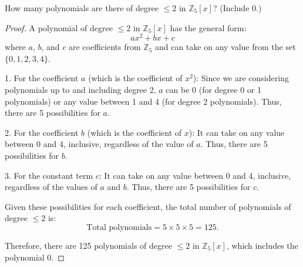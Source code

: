 \documentclass[12pt]{amsart}
\theoremstyle{definition}
\numberwithin{equation}{section}
\theoremstyle{plain}
\newcommand{\Z}{\mathbb{Z}}
\begin{document}
\begin{exercise}{6} How many polynomials are there of degree $\leq 2\text{ in } \Z_5[x]$? (Include 0.)

\begin{proof}
A polynomial of degree \( \leq 2 \) in \( \Z_5[x] \) has the general form:
\[ ax^2 + bx + c \]
where \( a \), \( b \), and \( c \) are coefficients from \( \Z_5 \) and can take on any value from the set \( \{0, 1, 2, 3, 4\} \).

1. For the coefficient \( a \) (which is the coefficient of \( x^2 \)):  
   Since we are considering polynomials up to and including degree 2, \( a \) can be 0 (for degree 0 or 1 polynomials) or any value between 1 and 4 (for degree 2 polynomials). Thus, there are 5 possibilities for \( a \).

2. For the coefficient \( b \) (which is the coefficient of \( x \)):  
   It can take on any value between 0 and 4, inclusive, regardless of the value of \( a \). Thus, there are 5 possibilities for \( b \).

3. For the constant term \( c \):  
   It can take on any value between 0 and 4, inclusive, regardless of the values of \( a \) and \( b \). Thus, there are 5 possibilities for \( c \).

Given these possibilities for each coefficient, the total number of polynomials of degree \( \leq 2 \) is:
\[ \text{Total polynomials} = 5 \times 5 \times 5 = 125. \]

Therefore, there are 125 polynomials of degree \( \leq 2 \) in \( \Z_5[x] \), which includes the polynomial 0.
\end{proof}
\end{exercise}
\vspace*{20pt}
\end{document}
